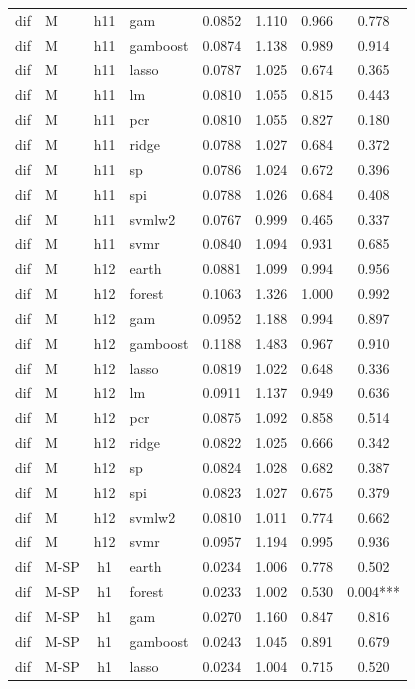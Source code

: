 \begin{ThreePartTable}
\begin{longtable}[t]{llclcccc}
dif & M & h11 & gam & 0.0852 & 1.110 & 0.966 & 0.778\\
dif & M & h11 & gamboost & 0.0874 & 1.138 & 0.989 & 0.914\\
dif & M & h11 & lasso & 0.0787 & 1.025 & 0.674 & 0.365\\
dif & M & h11 & lm & 0.0810 & 1.055 & 0.815 & 0.443\\
dif & M & h11 & pcr & 0.0810 & 1.055 & 0.827 & 0.180\\
dif & M & h11 & ridge & 0.0788 & 1.027 & 0.684 & 0.372\\
dif & M & h11 & sp & 0.0786 & 1.024 & 0.672 & 0.396\\
dif & M & h11 & spi & 0.0788 & 1.026 & 0.684 & 0.408\\
dif & M & h11 & svmlw2 & 0.0767 & 0.999 & 0.465 & 0.337\\
dif & M & h11 & svmr & 0.0840 & 1.094 & 0.931 & 0.685\\
\addlinespace
dif & M & h12 & earth & 0.0881 & 1.099 & 0.994 & 0.956\\
dif & M & h12 & forest & 0.1063 & 1.326 & 1.000 & 0.992\\
dif & M & h12 & gam & 0.0952 & 1.188 & 0.994 & 0.897\\
dif & M & h12 & gamboost & 0.1188 & 1.483 & 0.967 & 0.910\\
dif & M & h12 & lasso & 0.0819 & 1.022 & 0.648 & 0.336\\
dif & M & h12 & lm & 0.0911 & 1.137 & 0.949 & 0.636\\
dif & M & h12 & pcr & 0.0875 & 1.092 & 0.858 & 0.514\\
dif & M & h12 & ridge & 0.0822 & 1.025 & 0.666 & 0.342\\
dif & M & h12 & sp & 0.0824 & 1.028 & 0.682 & 0.387\\
dif & M & h12 & spi & 0.0823 & 1.027 & 0.675 & 0.379\\
dif & M & h12 & svmlw2 & 0.0810 & 1.011 & 0.774 & 0.662\\
dif & M & h12 & svmr & 0.0957 & 1.194 & 0.995 & 0.936\\
\addlinespace
dif & M-SP & h1 & earth & 0.0234 & 1.006 & 0.778 & 0.502\\
dif & M-SP & h1 & forest & 0.0233 & 1.002 & 0.530 & 0.004***\\
dif & M-SP & h1 & gam & 0.0270 & 1.160 & 0.847 & 0.816\\
dif & M-SP & h1 & gamboost & 0.0243 & 1.045 & 0.891 & 0.679\\
dif & M-SP & h1 & lasso & 0.0234 & 1.004 & 0.715 & 0.520\\

\end{longtable}
\end{ThreePartTable}
